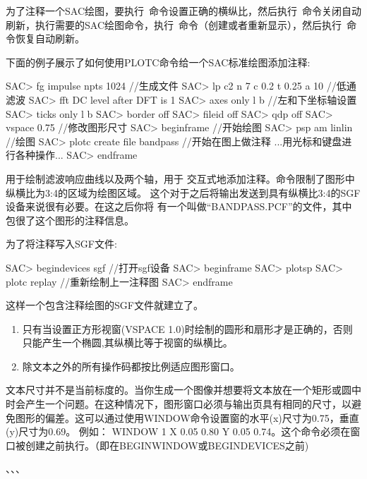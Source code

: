 为了注释一个SAC绘图，要执行~命令设置正确的横纵比，然后执行~命令关闭自动刷新，执行需要的SAC绘图命令，执行~命令（创建或者重新显示），然后执行~命令恢复自动刷新。

下面的例子展示了如何使用PLOTC命令给一个SAC标准绘图添加注释:
\begin{SACCode}
SAC> fg impulse npts 1024                      //生成文件
SAC> lp c2 n 7 c 0.2 t 0.25 a 10               //低通滤波
SAC> fft
 DC level after DFT is 1
SAC> axes only l b                             //左和下坐标轴设置
SAC> ticks only l b
SAC> border off
SAC> fileid off
SAC> qdp off
SAC> vspace 0.75                              //修改图形尺寸
SAC> beginframe                               //开始绘图
SAC> psp am linlin                            //绘图
SAC> plotc create file bandpass               //开始在图上做注释
...用光标和键盘进行各种操作...
SAC> endframe
\end{SACCode}

用于绘制滤波响应曲线以及两个轴，用于
交互式地添加注释。命令限制了图形中纵横比为3:4的区域为绘图区域。
这个对于之后将输出发送到具有纵横比3:4的SGF设备来说很有必要。在这之后你将
有一个叫做``BANDPASS.PCF''的文件，其中包很了这个图形的注释信息。

为了将注释写入SGF文件:
\begin{SACCode}
SAC> begindevices sgf                       //打开sgf设备
SAC> beginframe
SAC> plotsp
SAC> plotc replay                           //重新绘制上一注释图
SAC> endframe
\end{SACCode}
这样一个包含注释绘图的SGF文件就建立了。

\begin{enumerate}
\item 只有当设置正方形视窗(VSPACE 1.0)时绘制的圆形和扇形才是正确的，否则只能产生一个椭圆,其纵横比等于视窗的纵横比。
\item 除文本之外的所有操作码都按比例适应图形窗口。
\end{enumerate}
文本尺寸并不是当前标度的。当你生成一个图像并想要将文本放在一个矩形或圆中时会产生一个问题。在这种情况下，图形窗口必须与输出页具有相同的尺寸，以避免图形的偏差。这可以通过使用WINDOW命令设置窗的水平(x)尺寸为0.75，垂直(y)尺寸为0.69。
例如： WINDOW 1 X 0.05 0.80 Y 0.05 0.74。这个命令必须在窗口被创建之前执行。（即在BEGINWINDOW或BEGINDEVICES之前)

、、、


